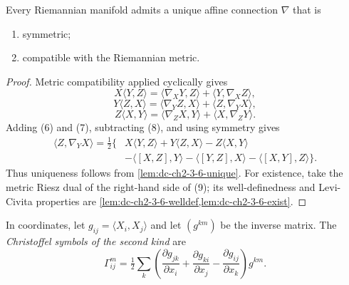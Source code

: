 \begin{theorem}
  \label{thm:dc-ch2-3-6}


  Every Riemannian manifold admits a unique affine connection $\nabla$ that is
  \begin{enumerate}
    \item[(a)] symmetric;
    \item[(b)] compatible with the Riemannian metric.
  \end{enumerate}
\end{theorem}
\begin{proof}

  \sketch
  Metric compatibility applied cyclically gives
  \[
    X\langle Y,Z\rangle
      =\langle\nabla_XY,Z\rangle+\langle Y,\nabla_XZ\rangle,\tag{6}
  \]
  \[
    Y\langle Z,X\rangle
      =\langle\nabla_YZ,X\rangle+\langle Z,\nabla_YX\rangle,\tag{7}
  \]
  \[
    Z\langle X,Y\rangle
      =\langle\nabla_ZX,Y\rangle+\langle X,\nabla_ZY\rangle.\tag{8}
  \]
  Adding (6) and (7), subtracting (8), and using symmetry gives
  \[
    \begin{aligned}
    \langle Z,\nabla_YX\rangle=\tfrac12\{&X\langle Y,Z\rangle
      +Y\langle Z,X\rangle-Z\langle X,Y\rangle\\
      &-\langle[X,Z],Y\rangle-\langle[Y,Z],X\rangle
       -\langle[X,Y],Z\rangle\}.\tag{9}
    \end{aligned}
  \]
  Thus uniqueness follows from \cref{lem:dc-ch2-3-6-unique}. For existence,
  take the metric Riesz dual of the right-hand side of (9); its
  well-definedness and Levi-Civita properties are
  \cref{lem:dc-ch2-3-6-welldef,lem:dc-ch2-3-6-exist}.
\end{proof}

\begin{definition}
  \label{def:dc-ch2-3-7-christoffel}


  In coordinates, let $g_{ij}=\langle X_i,X_j\rangle$ and let $(g^{km})$ be
  the inverse matrix. The \emph{Christoffel symbols of the second kind} are
  \[
    \Gamma_{ij}^m
      =\tfrac12\sum_k\left(
        \frac{\partial g_{jk}}{\partial x_i}
       +\frac{\partial g_{ki}}{\partial x_j}
       -\frac{\partial g_{ij}}{\partial x_k}\right)g^{km}.\tag{10}
  \]
\end{definition}

